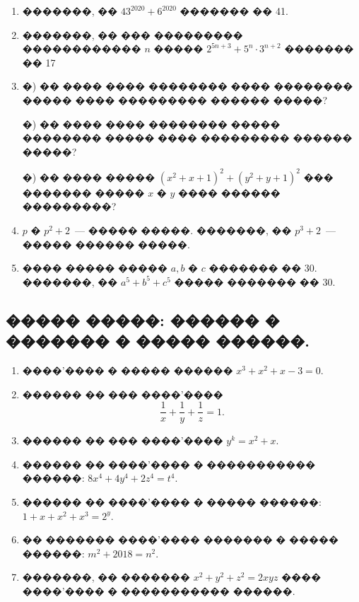 \documentclass[a4paper,12pt]{article}
\begin{document}
\begin{enumerate}
\item �������, �� $43^{2020}+6^{2020}$ ������� �� 41.

\item �������, �� ��� ��������� ������������ $n$ ����� $2^{5n+3}+5^{n}\cdot 3^{n+2}$ ������� �� 17

\item �) �� ���� ���� �������� ���� �������� ����� ���� ��������� ������ �����?

�) �� ���� ���� �������� ����� �������� ����� ���� ��������� ������ �����?

�) �� ���� ����� $(x^{2}+x+1)^{2}+(y^{2}+y+1)^{2}$ ��� ������� ����� $x$ � $y$ ���� ������ ���������?

\item $p$ � $p^{2}+2$~--- ����� �����. �������, �� $p^{3}+2$~--- ����� ������ �����.

\item ���� ����� ����� $a,b$ � $c$ ������� �� 30. �������, �� $a^{5}+b^{5}+c^{5}$ ����� ������� �� 30.


\end{enumerate}






\newpage

\begin{center}
\section*{����� �����: ������ � ������� � ����� ������.}
\end{center}

\medskip\medskip\medskip

\begin{enumerate}
 \item ����'���� � ����� ������ $x^{3}+x^{2}+x-3=0$.

\item ������ �� ��� ����'���� $$\frac{1}{x}+\frac{1}{y}+\frac{1}{z}=1.$$

\item ������ �� ��� ����'���� $y^{k}=x^{2}+x$.

\item ������ �� ����'���� � ����������� ������: $8x^{4}+4y^{4}+2z^{4}=t^{4}.$

\item ������ �� ����'���� � ����� ������: $1+x+x^{2}+x^{3}=2^{y}$.

\item �� ������� ����'���� ������� � ����� ������: $m^{2}+2018=n^{2}$.

\item �������, �� ������� $x^{2}+y^{2}+z^{2}=2xyz$ ���� ����'���� � ����������� ������.
\end{enumerate}
\end{document}
